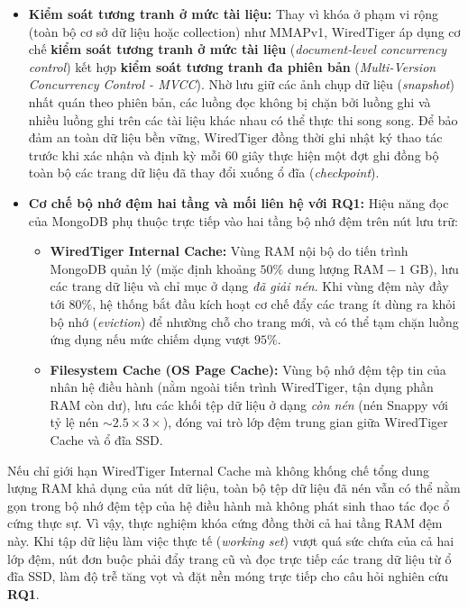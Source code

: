 \begin{itemize}[leftmargin=0.8cm, itemsep=4pt]
  \item \textbf{Kiểm soát tương tranh ở mức tài liệu:} Thay vì khóa ở phạm vi rộng (toàn bộ cơ sở dữ liệu hoặc collection) như MMAPv1, WiredTiger áp dụng cơ chế \textbf{kiểm soát tương tranh ở mức tài liệu} (\textit{document-level concurrency control}) kết hợp \textbf{kiểm soát tương tranh đa phiên bản} (\textit{Multi-Version Concurrency Control - MVCC}). Nhờ lưu giữ các ảnh chụp dữ liệu (\textit{snapshot}) nhất quán theo phiên bản, các luồng đọc không bị chặn bởi luồng ghi và nhiều luồng ghi trên các tài liệu khác nhau có thể thực thi song song. Để bảo đảm an toàn dữ liệu bền vững, WiredTiger đồng thời ghi nhật ký thao tác trước khi xác nhận và định kỳ mỗi 60 giây thực hiện một đợt ghi đồng bộ toàn bộ các trang dữ liệu đã thay đổi xuống ổ đĩa (\textit{checkpoint}).
  \item \textbf{Cơ chế bộ nhớ đệm hai tầng và mối liên hệ với RQ1:} Hiệu năng đọc của MongoDB phụ thuộc trực tiếp vào hai tầng bộ nhớ đệm trên nút lưu trữ:
  \begin{itemize}[leftmargin=0.6cm, itemsep=3pt]
    \item \textbf{WiredTiger Internal Cache:} Vùng RAM nội bộ do tiến trình MongoDB quản lý (mặc định khoảng $50\%$ dung lượng $\text{RAM} - 1\text{ GB}$), lưu các trang dữ liệu và chỉ mục ở dạng \textit{đã giải nén}. Khi vùng đệm này đầy tới $80\%$, hệ thống bắt đầu kích hoạt cơ chế đẩy các trang ít dùng ra khỏi bộ nhớ (\textit{eviction}) để nhường chỗ cho trang mới, và có thể tạm chặn luồng ứng dụng nếu mức chiếm dụng vượt $95\%$.
    \item \textbf{Filesystem Cache (OS Page Cache):} Vùng bộ nhớ đệm tệp tin của nhân hệ điều hành (nằm ngoài tiến trình WiredTiger, tận dụng phần RAM còn dư), lưu các khối tệp dữ liệu ở dạng \textit{còn nén} (nén Snappy với tỷ lệ nén $\sim 2.5\times$\textendash $3\times$), đóng vai trò lớp đệm trung gian giữa WiredTiger Cache và ổ đĩa SSD.
  \end{itemize}
\end{itemize}

Nếu chỉ giới hạn WiredTiger Internal Cache mà không khống chế tổng dung lượng RAM khả dụng của nút dữ liệu, toàn bộ tệp dữ liệu đã nén vẫn có thể nằm gọn trong bộ nhớ đệm tệp của hệ điều hành mà không phát sinh thao tác đọc ổ cứng thực sự. Vì vậy, thực nghiệm khóa cứng đồng thời cả hai tầng RAM đệm này. Khi tập dữ liệu làm việc thực tế (\textit{working set}) vượt quá sức chứa của cả hai lớp đệm, nút đơn buộc phải đẩy trang cũ và đọc trực tiếp các trang dữ liệu từ ổ đĩa SSD, làm độ trễ tăng vọt và đặt nền móng trực tiếp cho câu hỏi nghiên cứu \textbf{RQ1}.

